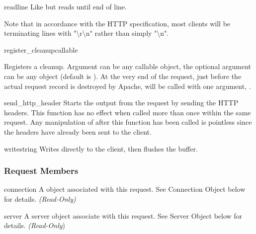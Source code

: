 \begin{methoddesc}[request]{readline}{}
Like  but reads until end of line. 
                  
Note that in accordance with the HTTP specification, most clients will
be terminating lines with "\textbackslash r\textbackslash n" rather
than simply "\textbackslash n".

\end{methoddesc}

\begin{methoddesc}[request]{register_cleanup}{callable}

Registers a cleanup. Argument  can be any callable
object, the optional argument  can be any object (default is
). At the very end of the request, just before the actual
request record is destroyed by Apache,  will be called
with one argument, .

\end{methoddesc}

\begin{methoddesc}[request]{send_http_header}{}
Starts the output from the request by sending the HTTP headers. This
function has no effect when called more than once within the same
request. Any manipulation of  after this
function has been called is pointless since the headers have already
been sent to the client.
\end{methoddesc}

\begin{methoddesc}[request]{write}{string}
Writes  directly to the client, then flushes the buffer. 
\end{methoddesc}

\subsubsection{Request Members\label{pyapi-mprequest-mem}}

\begin{memberdesc}[request]{connection}
A  object associated with this request. See
Connection Object below for details.
\emph{(Read-Only)}
\end{memberdesc}

\begin{memberdesc}[request]{server}
A server object associate with this request. See Server Object below
for details.
\emph{(Read-Only})
\end{memberdesc}

